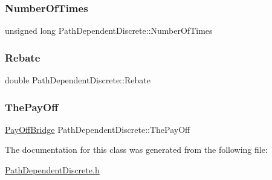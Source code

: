 \subsubsection{\texorpdfstring{Number\+Of\+Times}{NumberOfTimes}}
{\footnotesize\ttfamily unsigned long Path\+Dependent\+Discrete\+::\+Number\+Of\+Times\hspace{0.3cm}{\ttfamily [protected]}}

\hypertarget{classPathDependentDiscrete_a1016842b49bbd92ac77f67934b0adda3}{}\label{classPathDependentDiscrete_a1016842b49bbd92ac77f67934b0adda3} 
\subsubsection{\texorpdfstring{Rebate}{Rebate}}
{\footnotesize\ttfamily double Path\+Dependent\+Discrete\+::\+Rebate\hspace{0.3cm}{\ttfamily [protected]}}

\hypertarget{classPathDependentDiscrete_ab2486c33ea83f1f7bdd7900438e1e454}{}\label{classPathDependentDiscrete_ab2486c33ea83f1f7bdd7900438e1e454} 
\subsubsection{\texorpdfstring{The\+Pay\+Off}{ThePayOff}}
{\footnotesize\ttfamily \hyperlink{classPayOffBridge}{Pay\+Off\+Bridge} Path\+Dependent\+Discrete\+::\+The\+Pay\+Off\hspace{0.3cm}{\ttfamily [protected]}}



The documentation for this class was generated from the following file\+:\begin{DoxyCompactItemize}
\item 
\hyperlink{PathDependentDiscrete_8h}{Path\+Dependent\+Discrete.\+h}\end{DoxyCompactItemize}
